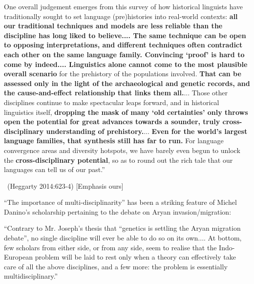 \begin{myquote}
One overall judgement emerges from this survey of how historical linguists have traditionally sought to set language (pre)histories into real-world contexts: \textbf{all our traditional techniques and models are less reliable than the discipline has long liked to believe.... The same technique can be open to opposing interpretations, and different techniques often contradict each other on the same language family. Convincing ‘proof’ is hard to come by indeed.... Linguistics alone cannot come to the most plausible overall scenario} for the prehistory of the populations involved. \textbf{That can be assessed only in the light of the archaeological and genetic records, and the cause-and-effect relationship that links them all.}... Those other disciplines continue to make spectacular leaps forward, and in historical linguistics itself, \textbf{dropping the mask of many ‘old certainties’ only throws open the potential for great advances towards a sounder, truly cross-disciplinary understanding of prehistory.}... \textbf{Even for the world’s largest language families, that synthesis still has far to run.} For language convergence areas and diversity hotspots, we have barely even begun to unlock the \textbf{cross-disciplinary potential}, so as to round out the rich tale that our languages can tell us of our past.”

~\hfill (Heggarty 2014:623-4) [Emphasis ours]
\end{myquote}

“The importance of multi-disciplinarity” has been a striking feature of Michel Danino’s scholarship pertaining to the debate on Aryan invasion/migration:

\newpage

\begin{myquote}
“Contrary to Mr. Joseph’s thesis that “genetics is settling the Aryan migration debate”, no single discipline will ever be able to do so on its own.... At bottom, few scholars from either side, or from any side, seem to realise that the Indo-European problem will be laid to rest only when a theory can effectively take care of all the above disciplines, and a few more: the problem is essentially multidisciplinary.”
\end{myquote}

